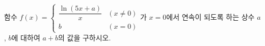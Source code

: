 함수 $f(x)=\begin{cases} \dfrac{\ln(5x+a)}{x} & (x\ne 0) \\ b & (x=0) \end{cases}$가 $x=0$에서 연속이 되도록 하는 상수 $a$, $b$에 대하여 $a+b$의 값을 구하시오.
